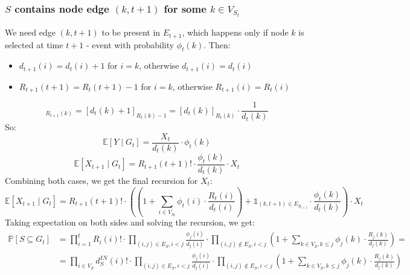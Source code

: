 \documentclass{article}
\begin{document}
\subsubsection*{$S$ contains node edge ${(k, t+1)}$ for some $k \in V_{S_t}$}
We need edge ${(k, t+1)}$ to be present in $E_{t+1}$, which happens only if node $k$ is selected at time $t+1$ - event with probability $\phi_t(k)$.
Then:
\begin{itemize}
    \item $d_{t+1}(i) = d_t(i) + 1$ for $i = k$, otherwise $d_{t+1}(i) = d_t(i)$
    \item $R_{t+1}(t+1) = R_t(t+1) - 1$ for $i = k$, otherwise $R_{t+1}(i) = R_t(i)$
\end{itemize}

\begin{equation}
    [d_{t+1}(k)]_{R_{t+1}(k)} = [d_t(k) + 1]_{R_t(k) - 1} = [d_t(k)]_{R_t(k)} \cdot \frac{1}{d_t(k)}
\end{equation}
So:
\begin{equation}
    \mathds{E}[Y \mid G_t] = \frac{X_t }{d_t(k)} \cdot \phi_t(k)
\end{equation}
\begin{equation}
    \mathds{E}[X_{t+1} \mid G_t] = R_{t+1}(t+1)! \cdot \frac{\phi_t(k)}{d_t(k)} \cdot X_t
\end{equation}
\newline
Combining both cases, we get the final recursion for $X_t$:
\begin{equation}
    \mathds{E}[X_{t+1} \mid G_t] = R_{t+1}(t+1)! \cdot \left( \left(1 + \sum_{i \in V_{S_t}} \phi_t(i) \cdot \frac{R_t(i)}{d_t(i)}\right) + \mathds{1}_{(k, t+1) \in E_{S_{t+1}}} \cdot \frac{\phi_t(k)}{d_t(k)} \right) \cdot X_t
\end{equation}
\newline
Taking expectation on both sides and solving the recursion, we get:
\begin{align}
    \mathds{P}[S \subseteq G_t] &= \prod_{i=1}^{t} R_i(i)! \cdot \prod_{(i,j) \in E_{S}, i < j} \frac{\phi_j(i)}{d_j(i)} \cdot \prod_{(i,j) \notin E_{S}, i < j} \left(1 + \sum_{k \in V_{S}, k \leq j} \phi_j(k) \cdot \frac{R_j(k)}{d_j(k)}\right) = \\
                                &= \prod_{i \in V_S} d^{IN}_S(i)! \cdot \prod_{(i,j) \in E_{S}, i < j} \frac{\phi_j(i)}{d_j(i)} \cdot \prod_{(i,j) \notin E_{S}, i < j} \left(1 + \sum_{k \in V_{S}, k \leq j} \phi_j(k) \cdot \frac{R_j(k)}{d_j(k)}\right)
\end{align}
\newline
\newline
\end{document}

